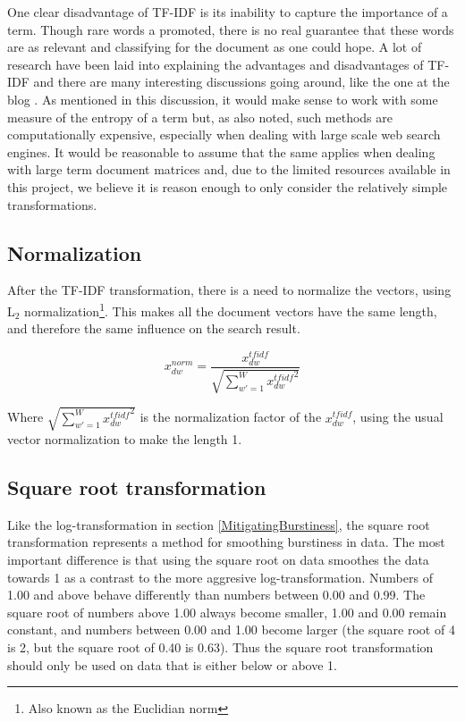 One clear disadvantage of TF-IDF is its inability to capture the
importance of a term. Though rare words a promoted, there is no real
guarantee that these words are as relevant and classifying for the
document as one could hope. A lot of research have been laid into
explaining the advantages and disadvantages of TF-IDF and there are
many interesting discussions going around, like the one at the blog
\cite{UnderstandingTFIDF}. As mentioned in this discussion, it would
make sense to work with some measure of the entropy of a term but, as
also noted, such methods are computationally expensive, especially
when dealing with large scale web search engines. It would be
reasonable to assume that the same applies when dealing with large
term document matrices and, due to the limited resources available in
this project, we believe it is reason enough to only consider the
relatively simple transformations.

\subsection{Normalization} 

After the TF-IDF transformation, there is a need to normalize the
vectors, using L$_2$ normalization\footnote{Also known as the
  Euclidian norm}. This makes all the document vectors have the same
length, and therefore the same influence on the search result.

\[
x_{dw}^{norm} = \frac{x_{dw}^{tfidf}}{\sqrt{\sum_{w\prime = 1}^{W} {x_{dw}^{tfidf}}^{2}}}
\]

Where $\sqrt{\sum_{w\prime = 1}^{W} {x_{dw}^{tfidf}}^{2}}$ is the
normalization factor of the $x_{dw}^{tfidf}$, using the usual vector
normalization to make the length 1.

\subsection{Square root transformation\label{SquareRoot}}

Like the log-transformation in section \ref{MitigatingBurstiness}, the square
root transformation represents a method for smoothing burstiness in
data. The most important difference is that using the square root on
data smoothes the data towards 1 as a contrast to the more aggresive
log-transformation. Numbers of 1.00 and above behave differently than
numbers between 0.00 and 0.99.  The square root of numbers above 1.00
always become smaller, 1.00 and 0.00 remain constant, and numbers
between 0.00 and 1.00 become larger (the square root of 4 is 2, but
the square root of 0.40 is 0.63).  Thus the square root transformation
should only be used on data that is either below or above 1.\\

